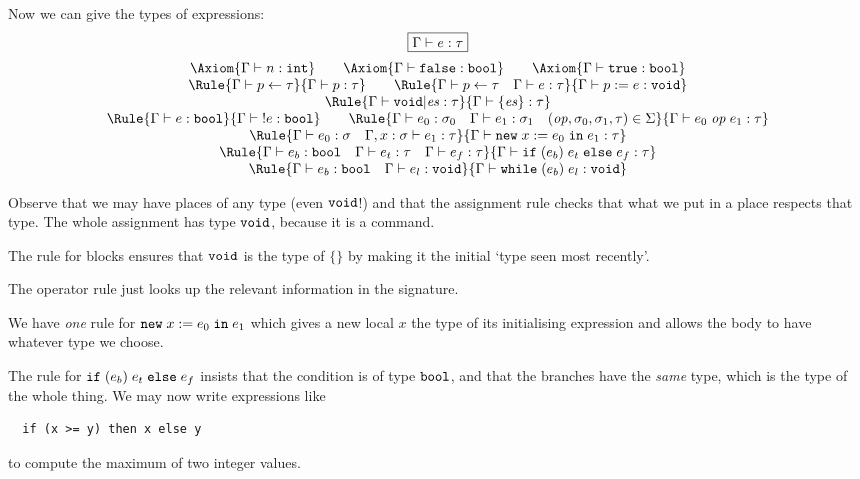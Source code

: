 \documentclass{article}
\begin{document}
Now we can give the types of expressions:
\[\begin{array}{c}
    \fbx{\Gamma\vdash e : \tau} \medskip \\

    \Axiom{\JEx\Gamma n\intg}\qquad
    \Axiom{\JEx\Gamma\false\bool} \qquad 
    \Axiom{\JEx\Gamma\true\bool} \\
    \Rule{\JPl\Gamma p\tau}
       {\JEx\Gamma p\tau} \qquad
    \Rule{\JPl\Gamma p\tau\quad \JEx\Gamma e\tau}
    {\JEx\Gamma{p\ass e}\void} \\
    \Rule{\JBl\Gamma\void\es\tau}
    {\JEx\Gamma{\{\es\}}\tau} \\
    \Rule{\JEx\Gamma e\bool}
         {\JEx\Gamma{\mathtt{!}e}\bool} \qquad
    \Rule{\JEx\Gamma{e_0}{\sigma_0} \quad
          \JEx\Gamma{e_1}{\sigma_1} \quad
         (\mathit{op},\sigma_0,\sigma_1,\tau)\in\Sigma}
    {\JEx\Gamma{e_0\;\mathit{op}\;e_1}\tau} \\
    \Rule{\JEx\Gamma{e_0}\sigma \quad \JEx{\Gamma,x:\sigma}{e_1}\tau}
       {\JEx\Gamma{\newe x{e_0}{e_1}}\tau} \\
    \Rule{\JEx\Gamma{e_b}\bool\quad
    \JEx\Gamma{e_t}\tau\quad \JEx\Gamma{e_f}\tau}
      {\JEx\Gamma{\ifel{e_b}{e_t}{e_f}}\tau} \\
    \Rule{\JEx\Gamma{e_b}\bool\quad \JEx\Gamma{e_l}\void}
       {\JEx\Gamma{\whi{e_b}{e_l}}\void}
\end{array}   \]

Observe that we may have places of any type (even $\mathtt{void}$!) and that the assignment rule checks that what we put in a place respects that type.
The whole assignment has type $\mathtt{void}$, because it is a command.

The rule for blocks ensures that $\mathtt{void}$ is the type of $\{\}$
by making it the initial `type seen most recently'.

The operator rule just looks up the relevant information in the signature.

We have \emph{one} rule for $\mathtt{new}\;x\;\mathtt{:=}\; e_0\;\mathtt{in}\;e_1$ which gives a new local $x$
the type of its initialising expression and allows the body to have whatever type we choose.

The rule for $\mathtt{if}\;\mathtt{(}e_b\mathtt{)}\;e_t\;\mathtt{else}\;e_f$ insists that the condition is of type $\mathtt{bool}$, and that the branches have the \emph{same} type, which is the type of the whole thing. We may now write expressions like
\begin{verbatim}
  if (x >= y) then x else y
\end{verbatim}
to compute the maximum of two integer values.
\end{document}
